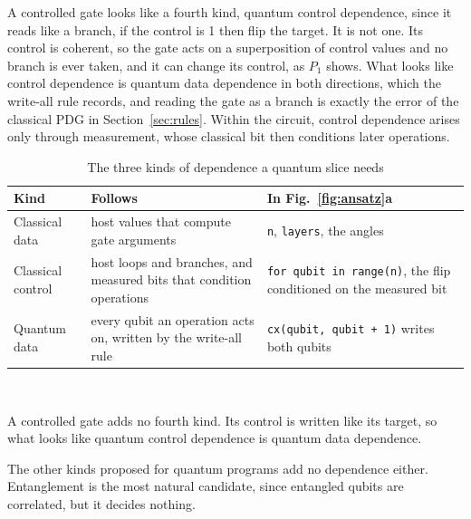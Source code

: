A controlled gate looks like a fourth kind, quantum control dependence, since it reads like a branch, if the control
is 1 then flip the target. It is not one. Its control is coherent, so the gate acts on a superposition of control
values and no branch is ever taken, and it can change its control, as $P_1$ shows. What looks like control
dependence is quantum data dependence in both directions, which the write-all rule records, and reading the gate as
a branch is exactly the error of the classical PDG in Section~\ref{sec:rules}. Within the circuit, control
dependence arises only through measurement, whose classical bit then conditions later operations.

\begin{table}[t]
  \centering
  \caption{The three kinds of dependence a quantum slice needs}
  \label{tab:kinds}
  \footnotesize\setlength{\tabcolsep}{3pt}\renewcommand{\arraystretch}{1.15}
  \begin{tabular}{@{}>{\raggedright\arraybackslash}p{1.55cm} >{\raggedright\arraybackslash}p{3.2cm}
                  >{\raggedright\arraybackslash}p{3.15cm}@{}}
    \toprule
    \textbf{Kind} & \textbf{Follows} & \textbf{In Fig.~\ref{fig:ansatz}a} \\
    \midrule
    Classical data & host values that compute gate arguments & \texttt{n}, \texttt{layers}, the angles \\
    \arrayrulecolor{black!25}\hline\arrayrulecolor{black}
    Classical control & host loops and branches, and measured bits that condition operations & \texttt{for qubit in range(n)}, the flip conditioned on the measured bit \\
    \arrayrulecolor{black!25}\hline\arrayrulecolor{black}
    Quantum data & every qubit an operation acts on, written by the write-all rule & \texttt{cx(qubit, qubit + 1)} writes both qubits \\
    \bottomrule
  \end{tabular}\\[3pt]
  \begin{minipage}{\columnwidth}\footnotesize
  A controlled gate adds no fourth kind. Its control is written like its target, so what looks like quantum control
  dependence is quantum data dependence.
  \end{minipage}
\end{table}

The other kinds proposed for quantum programs add no dependence either. Entanglement is the most natural
candidate, since entangled qubits are correlated, but it decides nothing.

